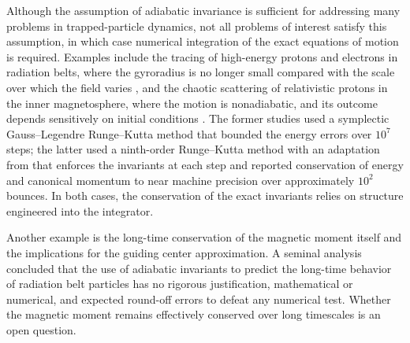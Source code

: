 \documentclass{article}
\begin{document}
Although the assumption of adiabatic invariance is sufficient for addressing many problems in trapped-particle dynamics, not all problems of interest satisfy this assumption, in which case numerical integration of the exact equations of motion is required. Examples include the tracing of high-energy protons and electrons in radiation belts, where the gyroradius is no longer small compared with the scale over which the field varies \cite{Yugo2001, Yugo2007}, and the chaotic scattering of relativistic protons in the inner magnetosphere, where the motion is nonadiabatic, and its outcome depends sensitively on initial conditions \cite{Meseguer2025}. The former studies \cite{Yugo2001, Yugo2007} used a symplectic Gauss--Legendre Runge--Kutta method that bounded the energy errors over $10^7$ steps; the latter \cite{Meseguer2025} used a ninth-order Runge--Kutta method with an adaptation from \cite{Calvo2006} that enforces the invariants at each step and reported conservation of energy and canonical momentum to near machine precision over approximately $10^2$ bounces. In both cases, the conservation of the exact invariants relies on structure engineered into the integrator.

Another example is the long-time conservation of the magnetic moment itself and the implications for the guiding center approximation. A seminal analysis \cite{DragtFinn1976} concluded that the use of adiabatic invariants to predict the long-time behavior of radiation belt particles has no rigorous justification, mathematical or numerical, and expected round-off errors to defeat any numerical test. Whether the magnetic moment remains effectively conserved over long timescales is an open question.

\end{document}
